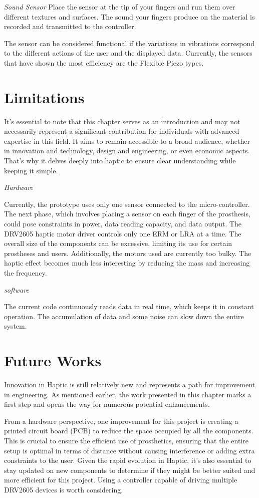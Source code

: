 \textit{Sound Sensor}
Place the sensor at the tip of your fingers and run them over different textures and surfaces. The sound your fingers produce on the material is recorded and transmitted to the controller.

The sensor can be considered functional if the variations in vibrations correspond to the different actions of the user and the displayed data. Currently, the sensors that have shown the most efficiency are the Flexible Piezo types.

\section{Limitations}
It’s essential to note that this chapter serves as an introduction and may not necessarily represent a significant contribution for individuals with advanced expertise in this field. It aims to remain accessible to a broad audience, whether in innovation and technology, design and engineering, or even economic aspects. That's why it delves deeply into haptic to ensure clear understanding while keeping it simple.

\textit{Hardware}

Currently, the prototype uses only one sensor connected to the micro-controller. The next phase, which involves placing a sensor on each finger of the prosthesis, could pose constraints in power, data reading capacity, and data output. The DRV2605 haptic motor driver controls only one ERM or LRA at a time. The overall size of the components can be excessive, limiting its use for certain prostheses and users. Additionally, the motors used are currently too bulky. The haptic effect becomes much less interesting by reducing the mass and increasing the frequency.

\textit{software}

The current code continuously reads data in real time, which keeps it in constant operation. The accumulation of data and some noise can slow down the entire system.

\section{Future Works}
Innovation in Haptic is still relatively new and represents a path for improvement in engineering. As mentioned earlier, the work presented in this chapter marks a first step and opens the way for numerous potential enhancements.

From a hardware perspective, one improvement for this project is creating a printed circuit board (PCB) to reduce the space occupied by all the components. This is crucial to ensure the efficient use of prosthetics, ensuring that the entire setup is optimal in terms of distance without causing interference or adding extra constraints to the user. Given the rapid evolution in Haptic, it's also essential to stay updated on new components to determine if they might be better suited and more efficient for this project. Using a controller capable of driving multiple DRV2605 devices is worth considering.

